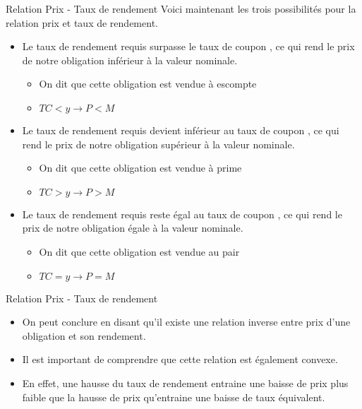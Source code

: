 \documentclass[11pt]{beamer}
\begin{document}
\begin{frame}{Relation Prix - Taux de rendement}
Voici maintenant les trois possibilités pour la relation prix et taux de rendement. 
\begin{itemize}
\item Le taux de rendement requis surpasse le taux de coupon , ce qui rend le prix de notre obligation inférieur à la valeur nominale. 
\begin{itemize}
\item On dit que cette obligation est vendue à escompte 
\item $TC < y \rightarrow P < M$
\end{itemize}
\item Le taux de rendement requis devient inférieur au taux de coupon , ce qui rend le prix de notre obligation supérieur à la valeur nominale. 
\begin{itemize}
\item On dit que cette obligation est vendue à prime
\item $TC > y \rightarrow P > M$
\end{itemize}
\item Le taux de rendement requis reste égal au taux de coupon , ce qui rend le prix de notre obligation égale à la valeur nominale. 
\begin{itemize}
\item On dit que cette obligation est vendue au pair
\item $TC = y \rightarrow P = M$
\end{itemize}
\end{itemize}
\end{frame}

\begin{frame}{Relation Prix - Taux de rendement}
\begin{itemize}
\item On peut conclure en disant qu'il existe une relation inverse entre prix d'une obligation et son rendement. 
\item Il est important de comprendre que cette relation est également convexe.
\item En effet, une hausse du taux de rendement entraine une baisse de prix plus faible que la hausse de prix qu'entraine une baisse de taux équivalent.
\end{itemize}
\end{frame}
\end{document}
